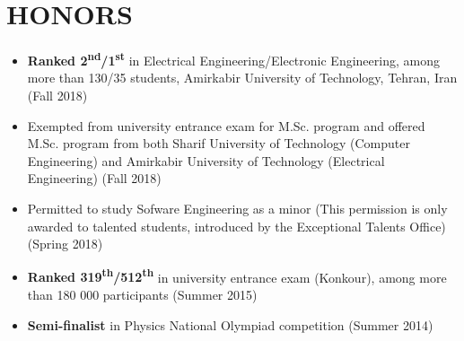\section{HONORS}
\begin{itemize}
	\item \textbf{Ranked 2\textsuperscript{nd}/1\textsuperscript{st}} in Electrical Engineering/Electronic Engineering, among more than 130/35 students, Amirkabir University of Technology, Tehran, Iran (Fall 2018)

	\item Exempted from university entrance exam for M.Sc. program and offered M.Sc. program from both Sharif University of Technology (Computer Engineering) and
Amirkabir University of Technology (Electrical Engineering) (Fall 2018)

	\item Permitted to study Sofware Engineering as a minor (This permission is only awarded to talented students, introduced by
the Exceptional Talents Office) (Spring 2018)

	\item \textbf{Ranked 319\textsuperscript{th}/512\textsuperscript{th}} in university entrance exam (Konkour), among more than 180 000 participants (Summer 2015)

	\item \textbf{Semi-finalist} in Physics National Olympiad competition (Summer 2014)
\end{itemize}

